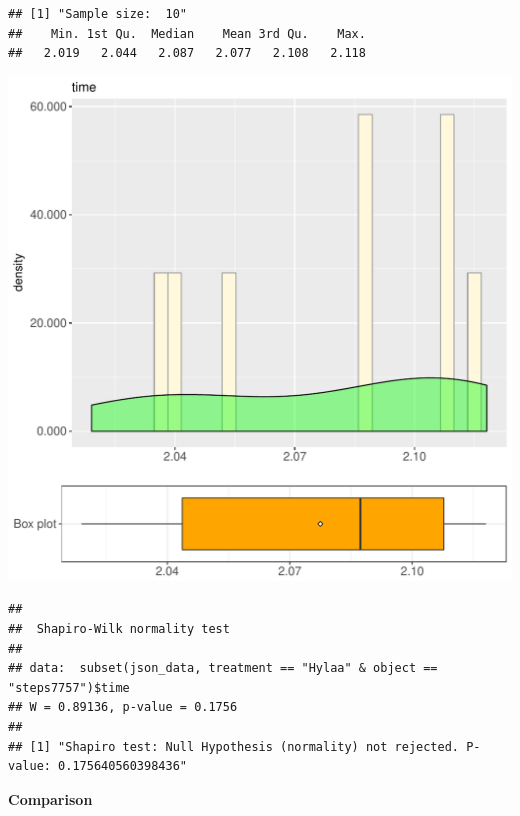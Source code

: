 \documentclass{article}\usepackage[]{graphicx}\usepackage[]{color}
\makeatletter
\def\maxwidth{ %
  \ifdim\Gin@nat@width>\linewidth
    \linewidth
  \else
    \Gin@nat@width
  \fi
}
\newenvironment{kframe}{%
 \def\at@end@of@kframe{}%
 \ifinner\ifhmode%
  \def\at@end@of@kframe{\end{minipage}}%
  \begin{minipage}{\columnwidth}%
 \fi\fi%
 \def\FrameCommand##1{\hskip\@totalleftmargin \hskip-\fboxsep
 \colorbox{shadecolor}{##1}\hskip-\fboxsep
     \hskip-\linewidth \hskip-\@totalleftmargin \hskip\columnwidth}%
 \MakeFramed {\advance\hsize-\width
   \@totalleftmargin\z@ \linewidth\hsize
   \@setminipage}}%
 {\par\unskip\endMakeFramed%
 \at@end@of@kframe}
\newenvironment{knitrout}{}{} %
\makeatother
\begin{document}
\begin{knitrout}
\color{fgcolor}\begin{kframe}
\begin{verbatim}
## [1] "Sample size:  10"
##    Min. 1st Qu.  Median    Mean 3rd Qu.    Max. 
##   2.019   2.044   2.087   2.077   2.108   2.118
\end{verbatim}
\end{kframe}
\includegraphics[width=\maxwidth]{figure/RH2_Hylaa_steps7757-1} 
\begin{kframe}\begin{verbatim}
## 
## 	Shapiro-Wilk normality test
## 
## data:  subset(json_data, treatment == "Hylaa" & object == "steps7757")$time
## W = 0.89136, p-value = 0.1756
## 
## [1] "Shapiro test: Null Hypothesis (normality) not rejected. P-value: 0.175640560398436"
\end{verbatim}
\end{kframe}
\end{knitrout}
  
 \textbf{Comparison}
  
\end{document}
